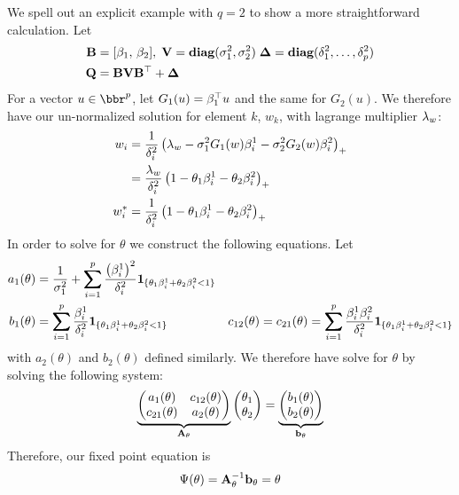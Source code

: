 \documentclass[12pt,leqno,letterpaper]{article}
\begin{document}
\begin{example}
We spell out an explicit example with $q=2$ to show a more straightforward calculation.
Let 
\begin{align}
\mathbf{B} &= [ \beta_1, \, \beta_2], \; \mathbf{V} = \textbf{diag}(\sigma_1^2, \sigma_2^2)\; {\bm{\Delta}} =\textbf{diag}(\delta_1^2 ,\ldots,\delta_p^2) \\
\mathbf{Q} &= \mathbf{B} \mathbf{V} \mathbf{B}^\top + {\bm{\Delta}}
\end{align}
For a vector $u \in \bbr^p$, let $G_1(u) = \beta_1^\top u$ and the same for $G_2(u)$.  We therefore have our un-normalized solution for element $k$, $w_k$, with lagrange multiplier $\lambda_w$:
\begin{align}
w_i &= \frac{1}{\delta_i^2}\left( \lambda_w - \sigma_1^2 G_1(w) \beta_i^1 - \sigma_2^2 G_2(w) \beta_i^2\right)_+ \\
&= \frac{\lambda_w}{\delta_i^2}\left(1 -  \theta_1 \beta_i^1 - \theta_2 \beta_i^2\right)_+\\
w_i^* &= \frac{1}{\delta_i^2}\left(1 -  \theta_1 \beta_i^1 - \theta_2 \beta_i^2\right)_+
\end{align}
In order to solve for $\theta$ we construct the following equations.  Let 
\begin{align*}
a_{1}(\theta) &= \frac{1}{\gs_1^2} + \sum_{i=1}^p \frac{\paren{\gb_i^1}^2}{\gd_i^2}\inds{\{\theta_1 \gb_i^1 + \theta_2 \gb_i^2<1\}} &\\
b_1(\theta) & = \sum_{i=1}^p \frac{\gb_i^1}{\gd_i^2}\inds{\{\theta_1 \gb_i^1 + \theta_2 \gb_i^2<1\}} \quad & c_{12}(\theta) = c_{21}(\theta) = \sum_{i=1}^p \frac{\gb_i^1 \gb_i^2}{\gd_i^2}\inds{\{\theta_1 \gb_i^1 + \theta_2 \gb_i^2<1\}}
\end{align*}
with $a_2(\theta)$ and $b_2(\theta)$ defined similarly.  We therefore have solve for $\theta$ by solving the following system:
\begin{align}\underbrace{\begin{pmatrix}
a_1(\theta) & c_{12}(\theta) \\
c_{21}(\theta) & a_2(\theta) 
\end{pmatrix}}_{\mathbf{A}_\theta}
\begin{pmatrix}
\theta_1 \\ \theta_2
\end{pmatrix}
= \underbrace{\begin{pmatrix}
b_1(\theta) \\ b_2(\theta)
\end{pmatrix}}_{\mathbf{b}_\theta}
\end{align}
Therefore, our fixed point equation is
\begin{align}
\Psi(\theta) = \mathbf{A}_\theta^{-1} \mathbf{b_\theta} = \theta
\end{align}
\end{example}
\end{document}
